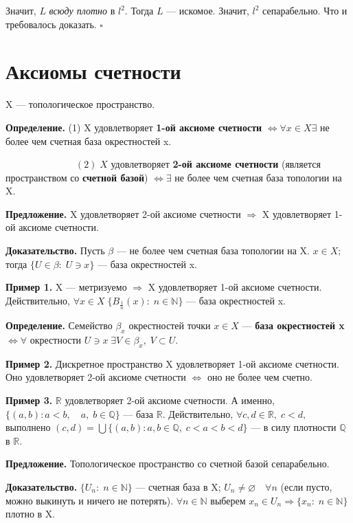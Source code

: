\documentclass[12pt,a4paper]{article}
\begin{document}
Значит, $L$ \textit{всюду плотно} в $l^{2}.$ Тогда $L$ --- искомое. Значит, $l^{2}$ сепарабельно. Что и требовалось доказать. $\square$ 

\section{Аксиомы счетности}

X --- топологическое пространство. 

\textbf{Определение.} (1) X удовлетворяет \textbf{1-ой аксиоме счетности} $\Leftrightarrow \forall x \in X \exists$ не более чем счетная база окрестностей x.

$\quad \quad \quad \quad \quad \quad \quad \;(2) \; X$ удовлетворяет \textbf{2-ой аксиоме счетности} (является пространством со \textbf{счетной базой}) $\Leftrightarrow \exists$ не более чем счетная база топологии на X. 

\textbf{Предложение.} X удовлетворяет 2-ой аксиоме счетности $\Rightarrow$ X удовлетворяет 1-ой аксиоме счетности. 

\textbf{Доказательство.} Пусть $\beta$ --- не более чем счетная база топологии на X. $x \in X;$ тогда $\{U \in \beta: \; U \ni x\}$ --- база окрестностей x. 

\textbf{Пример 1.} X --- метризуемо $\Rightarrow$ X удовлетворяет 1-ой аксиоме счетности. Действительно, $\forall x \in X \; \{B_{\frac{1}{n}}(x): \; n \in \mathbb{N}\}$ --- база окрестностей x. 

\textbf{Определение.} Семейство $\beta_{x}$ окрестностей точки $x \in X$ --- \textbf{база окрестностей x} $\Leftrightarrow \forall$ окрестности $U \ni x \; \exists V \in \beta_{x}, \; V \subset U.$

\textbf{Пример 2.} Дискретное пространство X удовлетворяет 1-ой аксиоме счетности. Оно удовлетворяет 2-ой аксиоме счетности $\Leftrightarrow$ оно не более чем счетно. 

\textbf{Пример 3.} $\mathbb{R}$ удовлетворяет 2-ой аксиоме счетности. А именно, $\{(a, b)\!\!: a < b, \quad a, \; b \in \mathbb{Q}\}$ --- база $\mathbb{R}.$ Действительно, $\forall c, d \in \mathbb{R}, \; c < d,$ выполнено $(c, d) = \bigcup\{(a, b): a, b \in \mathbb{Q}, \; c < a < b < d\}$ --- в силу плотности $\mathbb{Q}$ в $\mathbb{R}.$ 

\textbf{Предложение.} Топологическое пространство со счетной базой сепарабельно. 

\textbf{Доказательство.} $\{U_{n}\!\!: \; n \in \mathbb{N}\}$ --- счетная база в X; $U_{n} \neq \varnothing \quad \forall n$ (если пусто, можно выкинуть и ничего не потерять). $\forall n \in \mathbb{N}$ выберем $x_{n} \in U_{n} \Rightarrow \{x_{n}: \; n \in \mathbb{N}\}$ плотно в X. 
	
\end{document}
